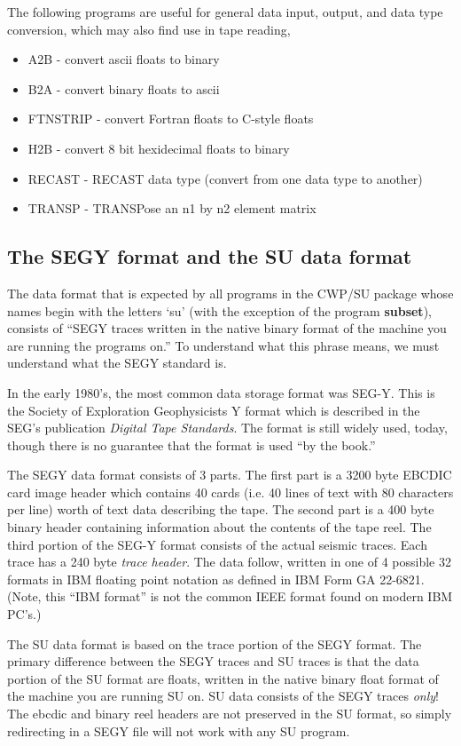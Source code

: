 {{{The following programs are useful for general data input, output,
and data type conversion, which may also find use in tape reading,

\begin{itemize}
\item A2B - convert ascii floats to binary
\item B2A - convert binary floats to ascii
\item FTNSTRIP - convert Fortran floats to C-style floats 
\item H2B - convert 8 bit hexidecimal floats to binary
\item RECAST - RECAST data type (convert from one data type to another)
\item TRANSP - TRANSPose an n1 by n2 element matrix 
\end{itemize}

\subsection{The SEGY format and the SU data format}

The data format that is expected by all programs in the CWP/SU package
whose names begin with the letters `su'  (with the exception of the
program {\bf subset}), consists of ``SEGY traces written in the native
binary format of the machine you are running the programs on.''
To understand what this phrase means, we must understand what the
SEGY standard is.

In the early 1980's, the most common data storage format was SEG-Y.
This is the Society of Exploration Geophysicists Y format which is
described in the SEG's publication {\em Digital Tape Standards\/}.
The format is still widely used, today, though there is no
guarantee that the format is used ``by the book.''

The SEGY data format consists of 3 parts. The first part is a
3200 byte EBCDIC card image header which contains 40 cards
(i.e. 40 lines of text with 80 characters per line) worth of
text data describing the tape.
The second part is a 400 byte binary header containing information
about the contents of the tape reel. The third portion of 
the SEG-Y format consists of the actual seismic traces. Each trace
has a 240 byte {\em trace header\/}. The data follow, written in
one of 4 possible 32 formats in IBM floating point notation
as defined in IBM Form GA 22-6821. (Note, this ``IBM format'' is
not the common IEEE format found on modern IBM PC's.)

The SU data format is based on the trace portion of the SEGY format.
The primary difference between the SEGY traces and SU traces is that
the data portion of the SU format are floats, written in the native
binary float format of the machine you are running SU on. SU data
consists of the SEGY traces {\em only\/}! The ebcdic and binary
reel headers are not preserved in the SU format,
so simply redirecting in a SEGY file will not work with any SU 
program.

}}}
